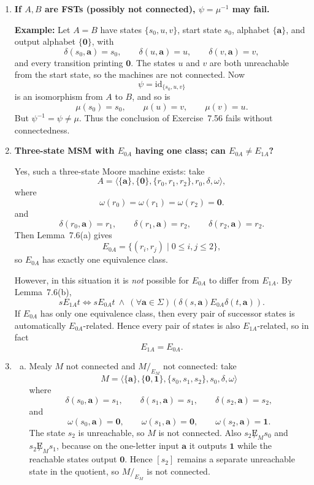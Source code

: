 \begin{enumerate}[{7.}1.]
\item \textbf{If $A,B$ are FSTs (possibly not connected), $\psi=\mu^{-1}$ may fail.}

\textbf{Example:}  Let $A=B$ have states $\{s_0,u,v\}$, start state $s_0$,
alphabet $\{\pmb{a}\}$, and output alphabet $\{\pmb{0}\}$, with
\[
  \delta(s_0,\pmb{a})=s_0,\qquad \delta(u,\pmb{a})=u,\qquad \delta(v,\pmb{a})=v,
\]
and every transition printing $\pmb{0}$.  The states $u$ and $v$ are both
unreachable from the start state, so the machines are not connected.  Now
\[
  \psi=\text{id}_{\{s_0,u,v\}}
\]
is an isomorphism from $A$ to $B$, and so is
\[
  \mu(s_0)=s_0,\qquad \mu(u)=v,\qquad \mu(v)=u.
\]
But $\psi^{-1}=\psi\neq \mu$.  Thus the conclusion of Exercise~7.56 fails
without connectedness.

\item \textbf{Three-state MSM with $E_{0A}$ having one class; can $E_{0A}\neq E_{1A}$?}

Yes, such a three-state Moore machine exists: take
\[
  A=\langle \{\pmb{a}\},\{\pmb{0}\},\{r_0,r_1,r_2\},r_0,\delta,\omega\rangle,
\]
where
\[
  \omega(r_0)=\omega(r_1)=\omega(r_2)=\pmb{0}.
\]
and
\[
  \delta(r_0,\pmb{a})=r_1,\qquad
  \delta(r_1,\pmb{a})=r_2,\qquad
  \delta(r_2,\pmb{a})=r_2.
\]
Then Lemma~7.6(a) gives
\[
  E_{0A}=\{(r_i,r_j)\mid 0\leq i,j\leq 2\},
\]
so $E_{0A}$ has exactly one equivalence class.

However, in this situation it is \emph{not} possible for $E_{0A}$ to differ from
$E_{1A}$.  By Lemma~7.6(b),
\[
  s E_{1A} t\iff s E_{0A} t\ \wedge\ (\forall \pmb{a}\in\Sigma) 
  (\delta(s,\pmb{a})E_{0A}\delta(t,\pmb{a})).
\]
If $E_{0A}$ has only one equivalence class, then every pair of successor states
is automatically $E_{0A}$-related.  Hence every pair of states is also
$E_{1A}$-related, so in fact
\[
  E_{1A}=E_{0A}.
\]

\item \begin{enumerate}[(a)]
  \item Mealy $M$ not connected and $M/_{E_M}$ not connected: take
  \[
    M=\langle \{\pmb{a}\},\{\pmb{0},\pmb{1}\},\{s_0,s_1,s_2\},s_0,\delta,\omega\rangle
  \]
  where
  \[
    \delta(s_0,\pmb{a})=s_1,\qquad
    \delta(s_1,\pmb{a})=s_1,\qquad
    \delta(s_2,\pmb{a})=s_2,
  \]
  and
  \[
    \omega(s_0,\pmb{a})=\pmb{0},\qquad
    \omega(s_1,\pmb{a})=\pmb{0},\qquad
    \omega(s_2,\pmb{a})=\pmb{1}.
  \]
  The state $s_2$ is unreachable, so $M$ is not connected.  Also
  $s_2\not E_M s_0$ and $s_2\not E_M s_1$, because on the one-letter input
  $\pmb{a}$ it outputs $\pmb{1}$ while the reachable states output $\pmb{0}$.
  Hence $[s_2]$ remains a separate unreachable state in the quotient, so
  $M/_{E_M}$ is not connected.


\end{enumerate}
\end{enumerate}
